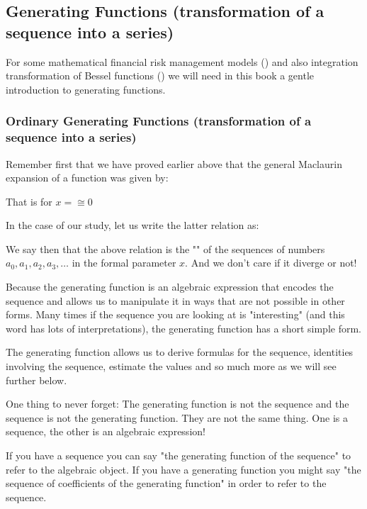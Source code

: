 	\pagebreak
	\subsection{Generating Functions (transformation of a sequence into a series)}
	For some mathematical financial risk management models () and also integration transformation of Bessel functions () we will need in this book a gentle introduction to generating functions.
	
	\subsubsection{Ordinary Generating Functions (transformation of a sequence into a series)}
	Remember first that we have proved earlier above that the general Maclaurin expansion of a function was given by:
	
	That is for $x=\cong 0$
	
	In the case of our study, let us write the latter relation as:
	
	We say then that the above relation is the "" of the sequences of numbers $a_0,a_1,a_2,a_3,\ldots$ in the formal parameter $x$. And we don't care if it diverge or not!
	
	Because the generating function is an algebraic expression that encodes the sequence and allows us to manipulate it in ways that are not possible in other forms. Many times if the sequence you are looking at is "interesting" (and this word has lots of interpretations), the generating function has a short simple form.

	The generating function allows us to derive formulas for the sequence, identities involving the sequence, estimate the values and so much more as we will see further below.	
	
	One thing to never forget: The generating function is not the sequence and the sequence is not the generating function. They are not the same thing. One is a sequence, the other is an algebraic expression!

	If you have a sequence you can say "the generating function of the sequence" to refer to the algebraic object. If you have a generating function you might say "the sequence of coefficients of the generating function" in order to refer to the sequence.
	
